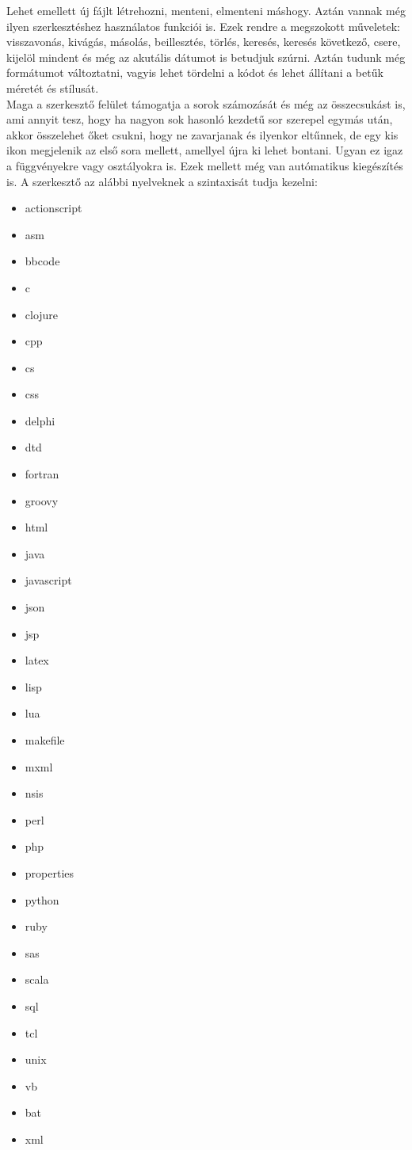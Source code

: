 \documentclass[12pt]{article}
\begin{document}
Lehet emellett új fájlt létrehozni, menteni, elmenteni máshogy. Aztán vannak még
ilyen szerkesztéshez használatos funkciói is. Ezek rendre a megszokott műveletek:
visszavonás, kivágás, másolás, beillesztés, törlés, keresés, keresés következő,
csere, kijelöl mindent és még az akutális dátumot is betudjuk szúrni. Aztán
tudunk még formátumot változtatni, vagyis lehet tördelni a kódot és lehet állítani
a betűk méretét és stílusát. \\
Maga a szerkesztő felület támogatja a sorok számozását és még az összecsukást is,
ami annyit tesz, hogy ha nagyon sok hasonló kezdetű sor szerepel egymás után,
akkor összelehet őket csukni, hogy ne zavarjanak és ilyenkor eltűnnek, de egy
kis ikon megjelenik az első sora mellett, amellyel újra ki lehet bontani. Ugyan
ez igaz a függvényekre vagy osztályokra is. Ezek mellett még van autómatikus
kiegészítés is.
A szerkesztő az alábbi nyelveknek a szintaxisát tudja kezelni:

\begin{multicols}{3}
  \begin{itemize}
    \item actionscript
    \item asm
    \item bbcode
    \item c
    \item clojure
    \item cpp
    \item cs
    \item css
    \item delphi
    \item dtd
    \item fortran
    \item groovy
    \item html
    \item java
    \item javascript
    \item json
    \item jsp
    \item latex
    \item lisp
    \item lua
    \item makefile
    \item mxml
    \item nsis
    \item perl
    \item php
    \item properties
    \item python
    \item ruby
    \item sas
    \item scala
    \item sql
    \item tcl
    \item unix
    \item vb
    \item bat
    \item xml
  \end{itemize}
\end{multicols}
\end{document}
